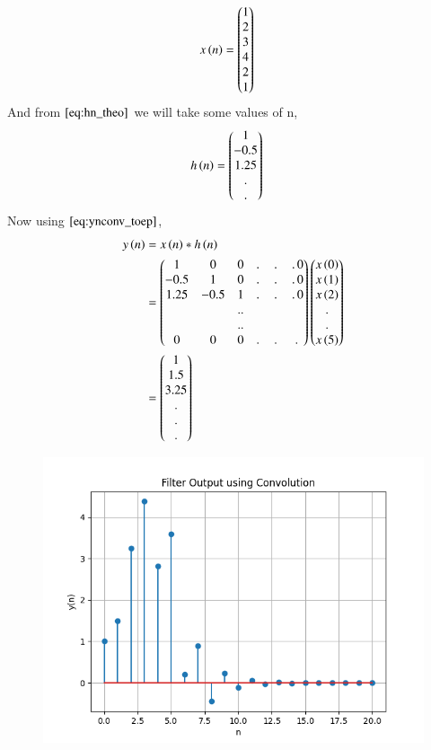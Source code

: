 \documentclass[journal,12pt,twocolumn]{IEEEtran}
\renewcommand\thesection{\arabic{section}}
\begin{document}
\begin{enumerate}[label=\thesection.\arabic*]
      \begin{align}
          x\left(n\right) &= \begin{pmatrix}1\\2\\3\\4\\2\\1\end{pmatrix}
      \end{align}
      And from $\eqref{eq:hn_theo}$ we will take some values of n,
      \begin{align} 
        h\left(n\right) &= \begin{pmatrix}1 \\ -0.5 \\ 1.25 \\. \\ . \end{pmatrix}
      \end{align}
     Now using $\eqref{eq:ynconv_toep}$,
      \begin{align}
        y\left(n\right) &= x\left(n\right)*h\left(n\right)\\
                  &= \begin{pmatrix}1 & 0 & 0 &.\,&.\,&.\,0 \\
                  -0.5 & 1 & 0 & .\,&.\,&.\,0 \\
                  1.25 & -0.5 & 1 & .\,&.\,&.\,0 \\
                   &&..\\&&..\\ 0 & 0 &  0 &.\,&.\,&.\, \end{pmatrix}\begin{pmatrix}x\left(0\right)\\x\left(1\right)\\x\left(2\right)\\ . \\.\\x\left(5\right)\end{pmatrix} \\
                  &= \begin{pmatrix}1\\1.5\\3.25\\.\\.\\.\end{pmatrix}
      \end{align}
      \begin{figure}
        \centering
        \includegraphics[width = \columnwidth]{Figs/ynconv_toeplitz.png}

\end{figure}
\end{enumerate}
\end{document}
